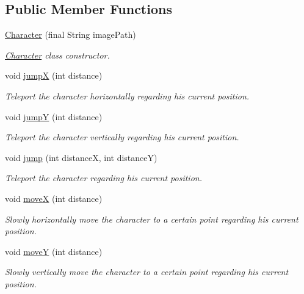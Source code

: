 \subsection*{Public Member Functions}
\begin{DoxyCompactItemize}
\item 
\hyperlink{a00005_a13c73f58bdba70ca3080d001140fd18a}{Character} (final String image\-Path)
\begin{DoxyCompactList}\small\item\em \hyperlink{a00005}{Character} class constructor. \end{DoxyCompactList}\item 
void \hyperlink{a00005_a1c4f59dee601acfb4cf3ec000a87e142}{jump\-X} (int distance)
\begin{DoxyCompactList}\small\item\em Teleport the character horizontally regarding his current position. \end{DoxyCompactList}\item 
void \hyperlink{a00005_aaddaea7c1175b19f80c0a10b87b59d75}{jump\-Y} (int distance)
\begin{DoxyCompactList}\small\item\em Teleport the character vertically regarding his current position. \end{DoxyCompactList}\item 
void \hyperlink{a00005_a38da898f19b8ac87049552edb20a70c8}{jump} (int distance\-X, int distance\-Y)
\begin{DoxyCompactList}\small\item\em Teleport the character regarding his current position. \end{DoxyCompactList}\item 
void \hyperlink{a00005_afd88136a2b4b1ece60657bb4481ab955}{move\-X} (int distance)
\begin{DoxyCompactList}\small\item\em Slowly horizontally move the character to a certain point regarding his current position. \end{DoxyCompactList}\item 
void \hyperlink{a00005_af0dd57e9b3d6a43fec1292f5333f0208}{move\-Y} (int distance)
\begin{DoxyCompactList}\small\item\em Slowly vertically move the character to a certain point regarding his current position. \end{DoxyCompactList}\item 

\end{DoxyCompactItemize}
